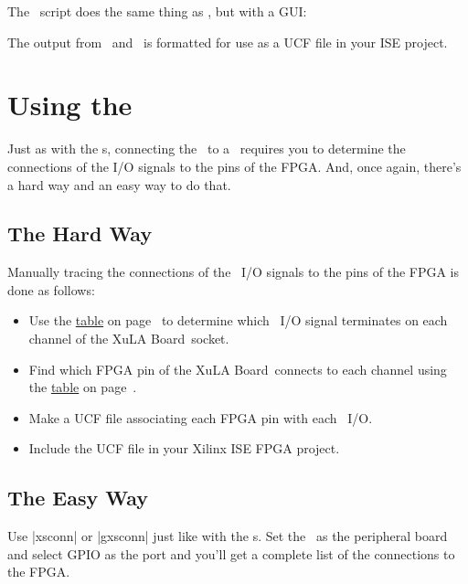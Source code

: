 \documentclass[letterpaper,11pt,oneside]{memoir}
\newcommand{\xula}{XuLA Board}
\renewcommand{\fixedpic}[1]{}
\begin{document}
\pagebreak %

The \ script does the same thing as , but with a GUI:

\fixedpic{\texttt{[image: gxsconn.png]}}

The output from \ and \ is formatted for use
as a UCF file in your ISE project. 


\section{Using the \rpi}

Just as with the \digpmod s, connecting the \product\ to a \rpi\ requires
you to determine the connections of the I/O signals to the pins of the FPGA.
And, once again, there's a hard way and an easy way to do that.

\subsection{The Hard Way}

Manually tracing the connections of the \rpi\ I/O signals to the pins of the FPGA
is done as follows:

\begin{itemize}
\item Use the \hyperref[tab:ChanneltoGPIOConnections]{table} on page~\pageref{tab:ChanneltoGPIOConnections} to determine 
	which \rpi\ I/O signal terminates on each channel of the \xula\ socket.
\item Find which FPGA pin of the \xula\ connects to each channel using the
	\hyperref[tab:ChanneltoFPGAConnections]{table} on page~\pageref{tab:ChanneltoFPGAConnections}.
\item Make a UCF file associating each FPGA pin with each \rpi\ I/O.
\item Include the UCF file in your Xilinx ISE FPGA project.
\end{itemize}

\subsection{The Easy Way}

Use |xsconn| or |gxsconn| just like with the \digpmod s.
Set the \rpi\ as the peripheral board and select GPIO as the port
and you'll get a complete list of the connections to the FPGA.
\end{document}
